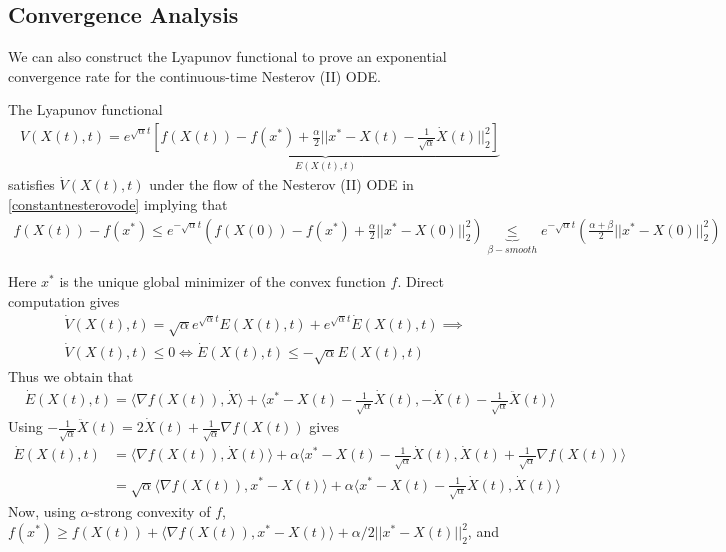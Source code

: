 \subsection{Convergence Analysis}
We can also construct the Lyapunov functional to prove an exponential convergence rate for the continuous-time Nesterov (II) ODE.
\begin{theorem}
The Lyapunov functional
\begin{align*}
    V(X(t), t) = e^{\sqrt{\alpha} t} \underbrace{\left [f(X(t)) - f(x^*) + \frac{\alpha}{2}||x^*-X(t)-\frac{1}{\sqrt{\alpha}} \dot{X}(t)||_2^2 \right]}_{E(X(t), t)}
\end{align*}
satisfies $\dot{V}(X(t), t)$ under the flow of the Nesterov (II) ODE in \eqref{constantnesterovode} implying that
\begin{align*}
    f(X(t)) - f(x^*) \leq e^{-\sqrt{\alpha}t} \left(f(X(0))-f(x^*)+\frac{\alpha}{2}||x^*-X(0)||_2^2 \right) \underbrace{\leq}_{\beta-smooth} e^{-\sqrt{\alpha}t} \left(\frac{\alpha+\beta}{2}||x^*-X(0)||_2^2 \right)
\end{align*}
\end{theorem}
\proofstart
Here $x^*$ is the unique global minimizer of the convex function $f$. Direct computation gives
\begin{align*}
    & \dot{V}(X(t), t) = \sqrt{\alpha} e^{\sqrt{\alpha} t} E(X(t), t) + e^{\sqrt{\alpha} t} \dot{E}(X(t), t) \implies \\ 
    & \dot{V}(X(t), t) \leq 0 \iff \dot{E}(X(t), t) \leq -\sqrt{\alpha} E(X(t), t)
\end{align*}
Thus we obtain that
\begin{align*}
    & \dot{E}(X(t), t) = \langle \nabla f(X(t)), \dot{X} \rangle + \langle x^* - X(t) - \frac{1}{\sqrt{\alpha}} \dot{X}(t), - \dot{X}(t) - \frac{1}{\sqrt{\alpha}} \ddot{X}(t) \rangle
\end{align*}
Using $-\frac{1}{\sqrt{\alpha}} \ddot{X}(t) = 2 \dot{X}(t) + \frac{1}{\sqrt{\alpha}} \nabla f(X(t))$ gives
\begin{align*}
    \dot{E}(X(t), t) &= \langle \nabla  f(X(t)), \dot{X}(t) \rangle + \alpha \langle x^* - X(t) - \frac{1}{\sqrt{\alpha}} \dot{X}(t), \dot{X}(t) + \frac{1}{\sqrt{\alpha}} \nabla f(X(t)) \rangle\\ &= \sqrt{\alpha} \langle \nabla f(X(t)), x^* - X(t) \rangle +
    \alpha \langle x^* - X(t) - \frac{1}{\sqrt{\alpha}} \dot{X}(t), \dot{X}(t) \rangle 
\end{align*}
Now, using $\alpha$-strong convexity of $f$, $f(x^*) \geq f(X(t)) + \langle \nabla f(X(t)), x^*-X(t) \rangle + \alpha/2 ||x^*-X(t)||_2^2$, and
